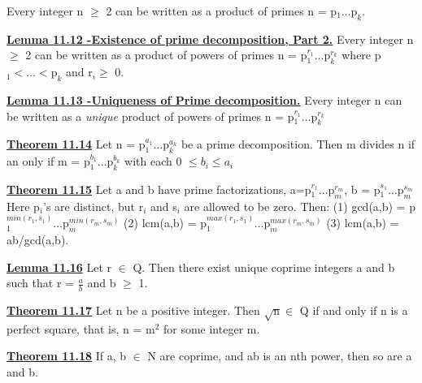 \documentclass[10pt]{article}
\begin{document}
 Every integer n $\geq$ 2 can be
 written as a product of primes n = p$_1 \dots \mbox{p}_k$.
 \par\textbf{\underline{Lemma 11.12 -Existence of prime decomposition, Part 2.}}
 Every integer n $\geq$ 2 can be
 written as a product of powers of primes n = p$_1^{r_1}
 \dots \mbox{p}_k^{r_k}$
where p$_1 <\dots< \mbox{p}_k$ and r$_i \geq$ 0.
\par\textbf{\underline{Lemma 11.13 -Uniqueness of Prime decomposition.}}
Every integer n can be written as
a \textit{unique} product of powers of primes n = p$_1^{r_1}
 \dots \mbox{p}_k^{r_k}$
\par\textbf{\underline{Theorem 11.14}}
Let n = p$_1^{a_1}
 \dots \mbox{p}_k^{a_k}$ be a prime decomposition. Then m divides n if an only if 
 m = p$_1^{b_1}
 \dots \mbox{p}_k^{b_k}$ with each 0 $\leq b_i \leq a_i$
 \par\textbf{\underline{Theorem 11.15}}
 Let a and b have prime factorizations,
a=p$_1^{r_1}
 \dots \mbox{p}_m^{r_m}$, b = p$_1^{s_1}
 \dots \mbox{p}_m^{s_m}$ Here p$_i$'s are distinct, but r$_i$ and s$_i$ are allowed to be zero. Then:
(1) gcd(a,b) = p$_1^{min(r_1,s_1)} \dots \mbox{p}_m^{min(r_m,s_m)}$
(2) lcm(a,b) = p$_1^{max(r_1,s_1)} \dots \mbox{p}_m^{max(r_m,s_m)}$
(3) lcm(a,b) = ab/gcd(a,b).
\par\textbf{\underline{Lemma 11.16}}
Let r $\in$ Q. Then there exist unique coprime integers a and b such that
r = $\frac{a}{b}$
 and b $\geq$ 1.
 \par\textbf{\underline{Theorem 11.17}}
 Let n be a positive integer. Then $\sqrt{\mbox{n}} \in$ Q if and only if n is a perfect
square, that is, n = m$^2$ for some integer m.
\par\textbf{\underline{Theorem 11.18}}
If a, b $\in$ N are coprime, and ab is an nth power, then so are a and b.
\end{document}
